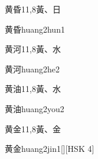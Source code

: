 \begin{Entry}{黄昏}{11,8}{⿈、⽇}
  \begin{Phonetics}{黄昏}{huang2hun1}
  \end{Phonetics}
\end{Entry}

\begin{Entry}{黄河}{11,8}{⿈、⽔}
  \begin{Phonetics}{黄河}{huang2he2}
  \end{Phonetics}
\end{Entry}

\begin{Entry}{黄油}{11,8}{⿈、⽔}
  \begin{Phonetics}{黄油}{huang2you2}
  \end{Phonetics}
\end{Entry}

\begin{Entry}{黄金}{11,8}{⿈、⾦}
  \begin{Phonetics}{黄金}{huang2jin1}[][HSK 4]
  \end{Phonetics}
\end{Entry}


